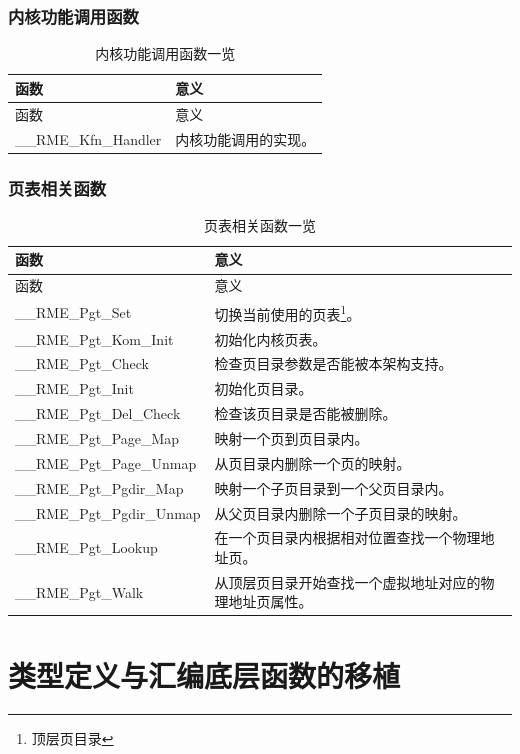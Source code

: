 \subsubsection{内核功能调用函数}\label{subsubsec:7-kernel-function-call-functions}

\begin{xltabular}{\textwidth}{@{}>{\hsize\raggedright\arraybackslash}X>{\hsize\raggedright\arraybackslash}X@{}}
\caption{内核功能调用函数一览}\label{tab:7-13-kernel-function-call-functions-overview}\\
\toprule
函数 & 意义\tabularnewline
\endfirsthead
\toprule
函数 & 意义\tabularnewline
\midrule
\endhead
\bottomrule
\endlastfoot
\_\_RME\_Kfn\_Handler & 内核功能调用的实现。\tabularnewline
\end{xltabular}

\subsubsection{页表相关函数}\label{subsubsec:7-page-table-functions}
\nopagebreak[4]

\begin{xltabular}{\textwidth}{@{}>{\hsize\raggedright\arraybackslash}X>{\hsize\raggedright\arraybackslash}X@{}}
\caption{页表相关函数一览}\label{tab:7-14-page-table-functions-overview}\\
\toprule
函数 & 意义\tabularnewline
\endfirsthead
\toprule
函数 & 意义\tabularnewline
\midrule
\endhead
\bottomrule
\endlastfoot
\_\_RME\_Pgt\_Set &
切换当前使用的页表\footnote{顶层页目录}。\tabularnewline
\_\_RME\_Pgt\_Kom\_Init & 初始化内核页表。\tabularnewline
\_\_RME\_Pgt\_Check & 检查页目录参数是否能被本架构支持。\tabularnewline
\_\_RME\_Pgt\_Init & 初始化页目录。\tabularnewline
\_\_RME\_Pgt\_Del\_Check & 检查该页目录是否能被删除。\tabularnewline
\_\_RME\_Pgt\_Page\_Map & 映射一个页到页目录内。\tabularnewline
\_\_RME\_Pgt\_Page\_Unmap & 从页目录内删除一个页的映射。\tabularnewline
\_\_RME\_Pgt\_Pgdir\_Map &
映射一个子页目录到一个父页目录内。\tabularnewline
\_\_RME\_Pgt\_Pgdir\_Unmap &
从父页目录内删除一个子页目录的映射。\tabularnewline
\_\_RME\_Pgt\_Lookup &
在一个页目录内根据相对位置查找一个物理地址页。\tabularnewline
\_\_RME\_Pgt\_Walk &
从顶层页目录开始查找一个虚拟地址对应的物理地址页属性。\tabularnewline
\end{xltabular}

\section{类型定义与汇编底层函数的移植}\label{sec:7-type-definition-and-assembly-function-porting}


